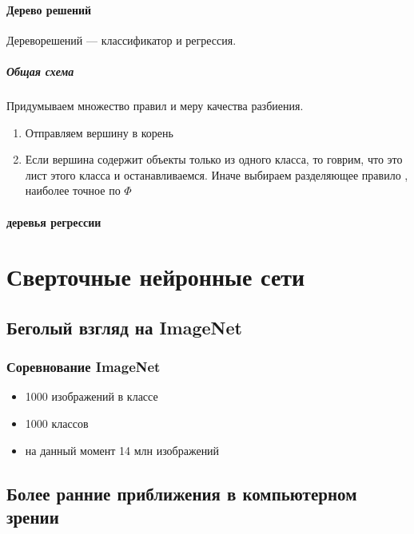 \documentclass[10pt,a4paper,oneside,titlepage]{report}
\theoremstyle{defenition}
\theoremstyle{theorem}
\begin{document}
\subsubsection{Дерево решений}

Дереворешений --- классификатор и регрессия.

\paragraph{Общая схема}

Придумываем множество правил и меру качества разбиения.

\begin{enumerate}
	\item Отправляем вершину в корень
	\item 
	\subitem Если вершина содержит  объекты только из одного класса, то говрим, что это лист этого класса и останавливаемся.
	\subitem Иначе выбираем разделяющее правило , наиболее точное по $\Phi$
\end{enumerate}

\subsubsection{деревья регрессии}

\chapter{Сверточные нейронные сети}

\section{Беголый взгляд на ImageNet}

\subsection{Соревнование ImageNet}

\begin{itemize}
	\item 1000 изображений в классе
	\item 1000 классов
	\item на данный момент 14 млн изображений
\end{itemize}

\section{Более ранние приближения в компьютерном зрении}
\end{document}
